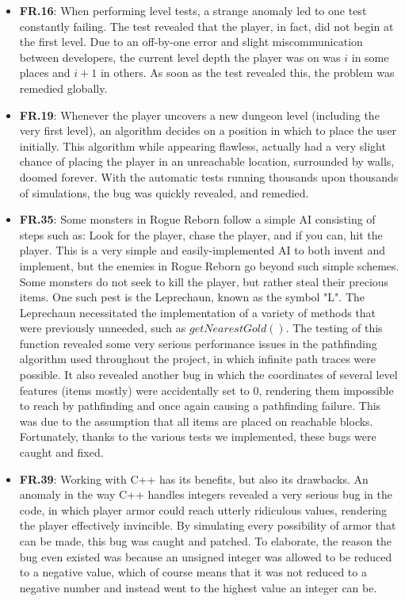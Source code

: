\documentclass[12pt, titlepage]{article}
\begin{document}
	\begin{itemize}
		\item[] \textbf{FR.16}: When performing level tests, a strange anomaly led to one test constantly failing. The test revealed that the player, in fact, did not begin at the first level. Due to an off-by-one error and slight miscommunication between developers, the current level depth the player was on was $i$ in some places and $i+1$ in others. As soon as the test revealed this, the problem was remedied globally.
		\item[] \textbf{FR.19}: Whenever the player uncovers a new dungeon level (including the very first level), an algorithm decides on a position in which to place the user initially. This algorithm while appearing flawless, actually had a very slight chance of placing the player in an unreachable location, surrounded by walls, doomed forever. With the automatic tests running thousands upon thousands of simulations, the bug was quickly revealed, and remedied.
		\item[] \textbf{FR.35}: Some monsters in Rogue Reborn follow a simple AI consisting of steps such as: Look for the player, chase the player, and if you can, hit the player. This is a very simple and easily-implemented AI to both invent and implement, but the enemies in Rogue Reborn go beyond such simple schemes. Some monsters do not seek to kill the player, but rather steal their precious items. One such pest is the Leprechaun, known as the symbol "L". The Leprechaun necessitated the implementation of a variety of methods that were previously unneeded, such as $getNearestGold()$. The testing of this function revealed some very serious performance issues in the pathfinding algorithm used throughout the project, in which infinite path traces were possible. It also revealed another bug in which the coordinates of several level features (items mostly) were accidentally set to 0, rendering them impossible to reach by pathfinding and once again causing a pathfinding failure. This was due to the assumption that all items are placed on reachable blocks. Fortunately, thanks to the various tests we implemented, these bugs were caught and fixed.
		\item[] \textbf{FR.39}: Working with C++ has its benefits, but also its drawbacks. An anomaly in the way C++ handles integers revealed a very serious bug in the code, in which player armor could reach utterly ridiculous values, rendering the player effectively invincible. By simulating every possibility of armor that can be made, this bug was caught and patched. To elaborate, the reason the bug even existed was because an unsigned integer was allowed to be reduced to a negative value, which of course means that it was not reduced to a negative number and instead went to the highest value an integer can be.
	\end{itemize}
\end{document}
